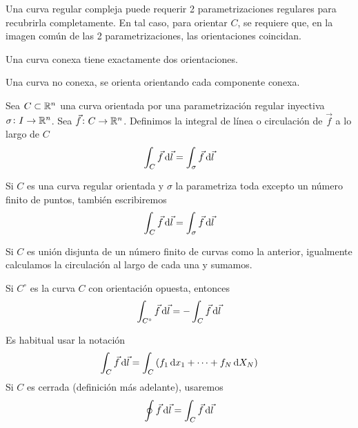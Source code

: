 \begin{obs}
    Una curva regular compleja puede requerir 2 parametrizaciones regulares para recubrirla completamente. En tal caso, para orientar $C$, se
    requiere que, en la imagen común de las 2 parametrizaciones, las orientaciones coincidan.
\end{obs}
\begin{example*}
    Una curva conexa tiene exactamente dos orientaciones.
\end{example*}
\begin{example*}
    Una curva no conexa, se orienta orientando cada componente conexa.
\end{example*}

\begin{defi}
    Sea $C \subset \mathbb{R}^n$ una curva orientada por una parametrización regular inyectiva $\sigma \colon I \to \mathbb{R}^n$. Sea $\vec{f} \colon C \to \mathbb{R}^n$.
    Definimos la integral de línea o circulación de $\vec{f}$ a lo largo de $C$
    \[
        \int_C \vec{f} \dif \vec{l} = \int_\sigma \vec{f} \dif \vec{l}
    \]
\end{defi}
\begin{obs*}
    Si $C$ es una curva regular orientada y $\sigma$ la parametriza toda excepto un número finito de puntos, tambi\'en escribiremos
    \[
        \int_C \vec{f} \dif \vec{l} = \int_\sigma \vec{f} \dif \vec{l}
    \]
\end{obs*}
\begin{obs*}
    Si $C$ es unión disjunta de un número finito de curvas como la anterior, igualmente calculamos la circulación al largo de cada una y sumamos.
\end{obs*}

\begin{obs}
    Si $C^\circ$ es la curva $C$ con orientación opuesta, entonces
    \[
        \int_{C^\circ} \vec{f} \dif \vec{l} = - \int_C \vec{f} \dif \vec{l}
    \]
\end{obs}

\begin{obs}
    Es habitual usar la notación
    \[
        \int_C \vec{f} \dif \vec{l} =  \int_C \left( f_1 \dif x_1 + \cdots + f_N \dif X_N \right)
    \]
    Si $C$ es cerrada (definición más adelante), usaremos
    \[
        \oint \vec{f} \dif \vec{l} = \int_C \vec{f} \dif \vec{l}
    \]
\end{obs}

